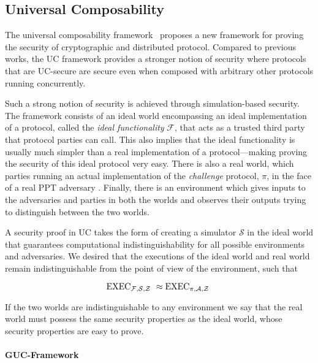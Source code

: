 \subsection{Universal Composability}
The universal composability framework~\cite{uc} proposes a new framework for proving the security of cryptographic and distributed protocol.
Compared to previous works, the UC framework provides a stronger notion of security where protocols that are UC-secure are secure even when composed with arbitrary other protocols running concurrently. 

Such a strong notion of security is achieved through simulation-based security. 
The framework consists of an ideal world encompassing an ideal implementation of a protocol, called the \textit{ideal functionality} $\mathcal{F}$, that acts as a trusted third party that protocol parties can call.
This also implies that the ideal functionality is usually much simpler than a real implementation of a protocol---making proving the security of this ideal protocol very easy.
There is also a real world, which parties running an actual implementation of the \textit{challenge} protocol, $\pi$, in the face of a real PPT adversary \Adversary.
Finally, there is an environment \Environment which gives inputs to the adversaries and parties in both the worlds and observes their outputs trying to distinguish between the two worlds. 

A security proof in UC takes the form of creating a simulator $\mathcal{S}$ in the ideal world that guarantees computational indistinguishability for all possible environments and adversaries. 
We desired that the executions of the ideal world and real world remain indistinguishable from the point of view of the environment, such that

$$ \text{EXEC}_{\mathcal{F},\mathcal{S},\mathcal{Z}~} \approx \text{EXEC}_{\pi,\mathcal{A},\mathcal{Z}~} $$

If the two worlds are indistinguishable to any environment we say that the real world must possess the same security properties as the ideal world, whose security properties are easy to prove.


\paragraph{GUC-Framework}




